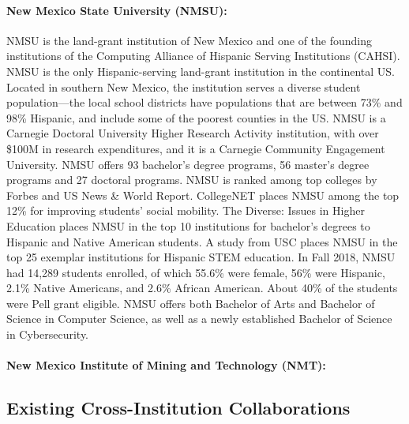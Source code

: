 \paragraph{New Mexico State University (NMSU):}
NMSU is the land-grant institution of New Mexico and one of the founding institutions of the Computing Alliance of Hispanic Serving Institutions (CAHSI). NMSU is the only Hispanic-serving land-grant institution in the continental US. Located in southern New Mexico, the institution serves a diverse student population---the local school districts have populations that are between 73\% and 98\% Hispanic, and include some of
the poorest counties in the US. NMSU is a Carnegie Doctoral University Higher Research Activity institution, with over \$100M in research expenditures, and it is a Carnegie Community Engagement University. NMSU offers 93 bachelor's degree programs, 56 master's degree programs and 27 doctoral programs. NMSU is ranked among top colleges by Forbes and US News \& World Report. CollegeNET places NMSU among the top 12\% for improving students’ social mobility. The Diverse: Issues in Higher Education places NMSU
in the top 10 institutions for bachelor’s degrees to Hispanic and Native American students. A study from USC places NMSU in the top 25 exemplar institutions for Hispanic STEM education.
In Fall 2018, NMSU had 14,289 students enrolled, of which 55.6\% were female, 56\% were Hispanic, 2.1\%
Native Americans, and 2.6\% African American. About 40\% of the students were Pell grant eligible.
NMSU offers both Bachelor of Arts and Bachelor of Science in Computer Science, as well as a newly established Bachelor of Science in Cybersecurity.  

\paragraph{New Mexico Institute of Mining and Technology (NMT):}

\subsection{Existing Cross-Institution Collaborations}